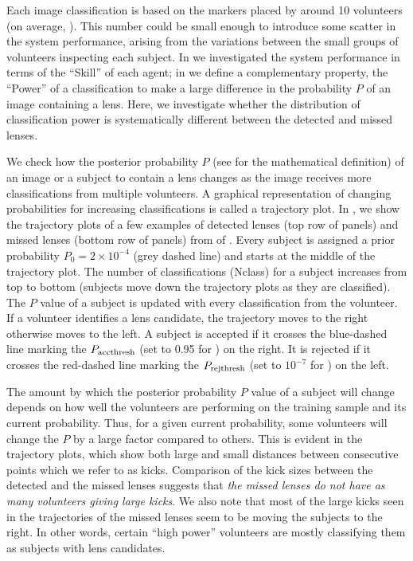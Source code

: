 \documentclass[useAMS,usenatbib,a4paper]{mn2e}
\begin{document}
Each \sw image classification is based on the markers placed by around 10
volunteers (on average, \PaperOne). This number could be
small enough to introduce some scatter in the system performance, arising from
the variations between the small groups of volunteers inspecting each subject.
In \PaperOne we investigated the system performance in terms of the ``Skill''
of each agent; in  we define a complementary property,
the ``Power'' of a classification to make a large difference in the probability
$P$ of an image containing a lens. Here, we investigate whether the distribution
of classification power is systematically different between the detected and missed lenses.

We check how the posterior probability $P$ (see \PaperOne for the
mathematical definition) of an image or a subject to contain a lens
changes as the image receives more classifications from multiple
volunteers. A graphical representation of changing probabilities for
increasing classifications is called a trajectory plot. In
, we show the trajectory plots of a few examples of
detected lenses (top row of panels) and missed lenses (bottom row of panels)
from \StageOne of \sw. Every subject is assigned a
prior probability $P_0=2\times10^{-4}$ (grey dashed line) and starts at
the middle of the trajectory plot. The number of classifications (Nclass) for a
subject increases from top to bottom (subjects move down the trajectory plots
as they are classified).  The $P$ value of a subject is updated
with every classification from the volunteer.  If a volunteer identifies
a lens candidate, the trajectory moves to the right otherwise moves to
the left. A subject is accepted if it crosses the blue-dashed line
marking the $P_{\rm acc thresh}$ (set to 0.95 for \StageOne) on the
right. It is rejected if it crosses the red-dashed line marking the
$P_{\rm rej thresh}$ (set to $10^{-7}$ for \StageOne) on the left.

The amount by which the posterior probability $P$ value of a subject will
change depends on how well the volunteers are performing on the training
sample and its current probability. Thus, for a given current
probability, some volunteers will change the $P$ by a large factor
compared to others. This is evident in the trajectory
plots, which show both large and small distances between consecutive points
which we refer to as kicks. Comparison of the kick sizes between the
detected and the missed lenses suggests that {\it the missed lenses do not
have as many volunteers giving large kicks}. We also note that most of
the large kicks seen in the trajectories of the missed lenses seem to be
moving the subjects to the right. In other words, certain ``high power''
volunteers are mostly classifying them as subjects with lens candidates.
\end{document}
